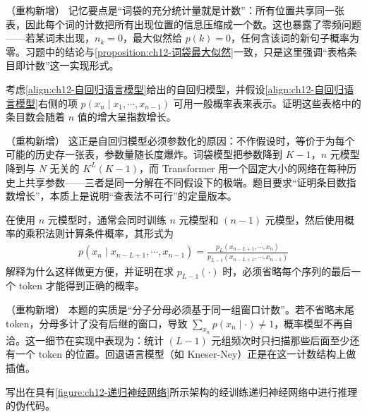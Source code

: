 \documentclass[../../main.tex]{subfiles}
\begin{document}
\begin{remark}（重构新增）
记忆要点是“词袋的充分统计量就是计数”：所有位置共享同一张表，因此每个词的计数把所有出现位置的信息压缩成一个数。这也暴露了零频问题——若某词未出现，$n_k=0$，最大似然给 $p(k)=0$，任何含该词的新句子概率为零。习题中的结论与\cref{proposition:ch12-词袋最大似然}一致，只是这里强调“表格条目即计数”这一实现形式。
\end{remark}

\begin{exercise}[（$\star$）]\label{exercise:ch12-12}
考虑\eqref{align:ch12-自回归语言模型}给出的自回归模型，并假设\eqref{align:ch12-自回归语言模型}右侧的项 $p\left(x_n\mid x_1,\cdots,x_{n-1}\right)$ 可用一般概率表来表示。证明这些表格中的条目数会随着 $n$ 值的增大呈指数增长。
\end{exercise}

\begin{remark}（重构新增）
这正是自回归模型必须参数化的原因：不作假设时，等价于为每个可能的历史存一张表，参数量随长度爆炸。词袋模型把参数降到 $K-1$，$n$ 元模型降到与 $N$ 无关的 $K^{L}(K-1)$，而 Transformer 用一个固定大小的网络在每种历史上共享参数——三者是同一分解在不同假设下的极端。题目要求“证明条目数指数增长”，本质上是说明“查表法不可行”的定量版本。
\end{remark}

\begin{exercise}[（$\star$）]\label{exercise:ch12-13}
在使用 $n$ 元模型时，通常会同时训练 $n$ 元模型和 $(n-1)$ 元模型，然后使用概率的乘积法则计算条件概率，其形式为
\begin{align}
p\left(x_n\mid x_{n-L+1},\cdots,x_{n-1}\right)=\frac{p_{L}\left(x_{n-L+1},\cdots,x_{n}\right)}{p_{L-1}\left(x_{n-L+1},\cdots,x_{n-1}\right)}
\label{align:ch12-元模型比值}
\end{align}
解释为什么这样做更方便，并证明在求 $p_{L-1}(\cdot)$ 时，必须省略每个序列的最后一个 token 才能得到正确的概率。
\end{exercise}

\begin{remark}（重构新增）
本题的实质是“分子分母必须基于同一组窗口计数”。若不省略末尾 token，分母多计了没有后继的窗口，导致 $\sum_{x_n}p(x_n\mid\cdot)\neq1$，概率模型不再自洽。这一细节在实现中表现为：统计 $(L-1)$ 元组频次时只扫描那些后面至少还有一个 token 的位置。回退语言模型（如 Kneser-Ney）正是在这一计数结构上做插值。
\end{remark}

\begin{exercise}\label{exercise:ch12-14}
写出在具有\cref{figure:ch12-递归神经网络}所示架构的经训练递归神经网络中进行推理的伪代码。
\end{exercise}
\end{document}
